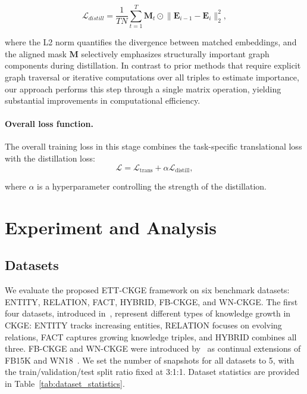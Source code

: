 \documentclass[runningheads]{llncs}
\begin{document}
\begin{equation}
\mathcal{L}_{distill} = \frac{1}{TN} \sum_{t=1}^{T} \mathbf{M}_{t} \odot \Big\| \mathbf{E}_{i-1} - \mathbf{E}_i \Big\|^2_2,
\end{equation}

\noindent where the L2 norm quantifies the divergence between matched embeddings, and the aligned mask $\mathbf{M}$ selectively emphasizes structurally important graph components during distillation. In contrast to prior methods that require explicit graph traversal or iterative computations over all triples to estimate importance, our approach performs this step through a single matrix operation, yielding substantial improvements in computational efficiency.

\paragraph{\textbf{Overall loss function.}} The overall training loss in this stage combines the task-specific translational loss with the distillation loss:
\begin{equation} 
    \mathcal{L} = \mathcal{L}_{\text{trans}} + \alpha \mathcal{L}_{\text{distill}}, 
    \end{equation} 

\noindent where $\alpha$ is a hyperparameter controlling the strength of the distillation.



\section{Experiment and Analysis}

\subsection{Datasets}

We evaluate the proposed ETT-CKGE framework on six benchmark datasets: ENTITY, RELATION, FACT, HYBRID, FB-CKGE, and WN-CKGE. The first four datasets, introduced in~\cite{cui2023lifelong}, represent different types of knowledge growth in CKGE: ENTITY tracks increasing entities, RELATION focuses on evolving relations, FACT captures growing knowledge triples, and HYBRID combines all three. FB-CKGE and WN-CKGE were introduced by~\cite{liu2024fast} as continual extensions of FB15K and WN18~\cite{bordes2013translating}. We set the number of snapshots for all datasets to 5, with the train/validation/test split ratio fixed at 3:1:1. Dataset statistics are provided in Table~\ref{tab:dataset_statistics}.
\end{document}
